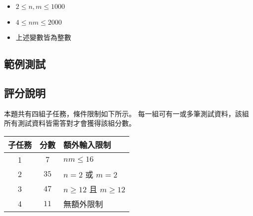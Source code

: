 \begin{itemize}
\tightlist
\item
  \begin{math}2 \le n, m \le 1000\end{math}
\item
  \begin{math}4 \le nm \le 2000\end{math}
\item
  上述變數皆為整數
\end{itemize}

\subsection{範例測試}

\begin{example}
%
%
\end{example}

\subsection{評分說明}

本題共有四組子任務，條件限制如下所示。
每一組可有一或多筆測試資料，該組所有測試資料皆需答對才會獲得該組分數。

\begin{longtable}[]{@{}ccl@{}}
\toprule
子任務 & 分數 & 額外輸入限制 \\
\midrule
\endhead
1 & \(7\) & \begin{math}nm \le 16\end{math} \\
2 & \(35\) & \begin{math}n = 2\end{math} 或
\begin{math}m = 2\end{math} \\
3 & \(47\) & \begin{math}n \ge 12\end{math} 且
\begin{math}m \ge 12\end{math} \\
4 & \(11\) & 無額外限制 \\
\bottomrule
\end{longtable}
